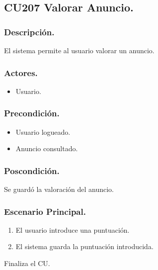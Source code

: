 \subsection{CU207 Valorar Anuncio.}
\subsubsection{Descripci\'{o}n.}
El sistema permite al usuario valorar un anuncio.
\subsubsection{Actores.}
\begin{itemize}
\item Usuario.
\end{itemize}
\subsubsection{Precondici\'{o}n.}
\begin{itemize}
\item Usuario logueado.
\item Anuncio consultado.
\end{itemize}
\subsubsection{Poscondici\'{o}n.}
Se guard\'{o} la valoraci\'{o}n del anuncio.
\subsubsection{Escenario Principal.}
\begin{enumerate}
\item El usuario introduce una puntuaci\'{o}n.
\item El sistema guarda la puntuaci\'{o}n introducida.
\end{enumerate}
Finaliza el CU.
